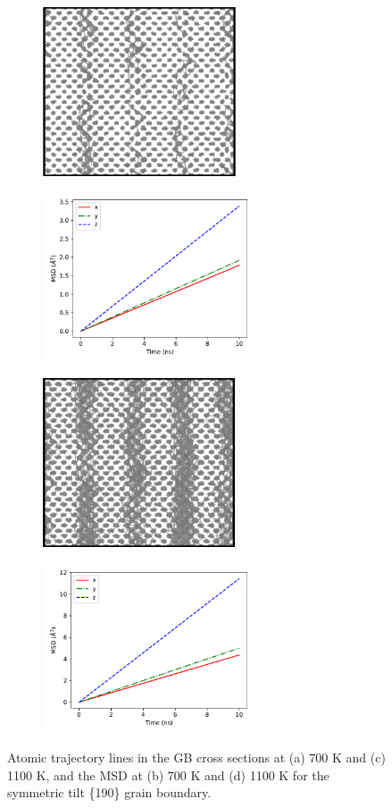 \documentclass{elsarticle}
\begin{document}
\begin{figure}[!ht]
\centering
	\begin{subfigure}{0.49\textwidth}
		\centering
		\caption{}
		\includegraphics[height=5cm]{190at700cs.png}
	\end{subfigure}
	\begin{subfigure}{0.49\textwidth}
		\centering
		\caption{}
		\includegraphics[height=5cm]{190at700xyz.pdf}
	\end{subfigure}
    \par\medskip
	\begin{subfigure}{0.49\textwidth}
		\centering
		\caption{}
		\includegraphics[height=5cm]{190at1100cs.png}
	\end{subfigure}
	\begin{subfigure}{0.49\textwidth}
		\centering
		\caption{}
		\includegraphics[height=5cm]{190at1100xyz.pdf}
	\end{subfigure}
\caption{Atomic trajectory lines in the GB cross sections at (a) 700 K and (c) 1100 K, and the MSD at (b) 700 K and (d) 1100 K for the symmetric tilt \{190\} grain boundary.}
\label{fig:190}
\end{figure}
\end{document}
